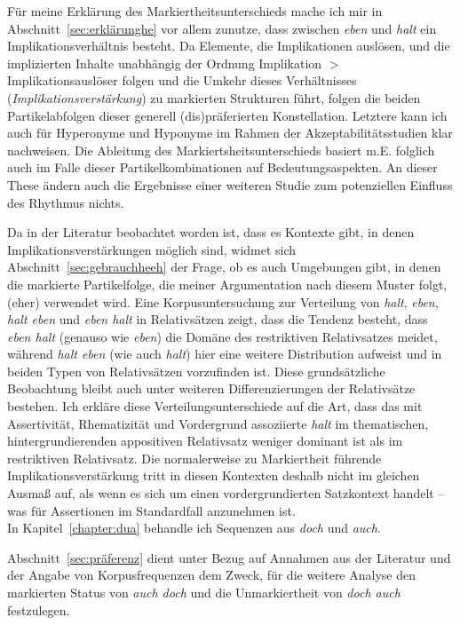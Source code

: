 Für meine Erklärung des Markiertheitsunterschieds  mache ich mir in Abschnitt~\ref{sec:erklärunghe} vor allem zunutze, dass zwischen \textit{eben} und \textit{halt} ein Implikationsverhältnis  besteht. Da Elemente, die Implikationen auslösen, und die implizierten Inhalte unabhängig der Ordnung Implikation $>$ Implikationsauslöser folgen und die Umkehr dieses Verhältnisses (\textit{Implikationsverstärkung})  zu markierten Strukturen führt, folgen die beiden Partikelabfolgen dieser generell (dis)präferierten Konstellation. Letztere kann ich auch für Hyperonyme und Hyponyme im Rahmen der Akzeptabilitätsstudien klar nachweisen. Die Ableitung des Markierts\-heitsunterschieds basiert m.E. folglich auch im Falle dieser Partikelkombinationen auf Bedeutungsas\-pekten. An dieser These ändern auch die Ergebnisse einer wei\-teren Studie zum potenziellen Einfluss des Rhythmus nichts. 

Da in der Literatur beobachtet worden ist, dass es Kontexte gibt, in denen Im\-plikationsverstärkungen möglich sind, widmet sich Abschnitt~\ref{sec:gebrauchheeh} der Frage, ob es auch Umgebungen gibt, in denen die markierte Partikelfolge, die meiner Argumentation nach diesem Muster folgt, (eher) verwendet wird. Eine Korpusuntersuchung zur Verteilung von \textit{halt}, \textit{eben}, \textit{halt eben} und \textit{eben halt} in Relativsätzen zeigt, dass die Tendenz besteht, dass \textit{eben halt} (genauso wie \textit{eben}) die Domäne des restriktiven Relativsatzes meidet, während \textit{halt eben} (wie auch \textit{halt}) hier eine weitere Distribution aufweist und in beiden Typen von Relativsätzen vorzufinden ist. Diese grundsätzliche Beobachtung bleibt auch unter weiteren Differenzierungen der Relativsätze bestehen. Ich erkläre diese Verteilungsunterschiede auf die Art, dass das mit Assertivität, Rhematizität und Vordergrund assoziierte \textit{halt} im thematischen, hintergrundierenden appositiven Relativsatz weniger dominant ist als im restriktiven Relativsatz. Die normalerweise zu Markiertheit führende Im\-plikationsverstärkung tritt in diesen Kontexten deshalb nicht im gleichen Ausmaß auf, als wenn es sich um einen vordergrundierten Satzkontext handelt – was für Assertionen im Standardfall anzunehmen ist.\\

\noindent
In Kapitel~\ref{chapter:dua} behandle ich Sequenzen aus \textit{doch} und \textit{auch}. 

Abschnitt~\ref{sec:präferenz} dient unter Bezug auf Annahmen aus der Literatur und der Angabe von Korpusfrequenzen dem Zweck, für die weitere Analyse den markierten Status von \textit{auch doch} und die Unmarkiertheit von \textit{doch auch} festzulegen.

